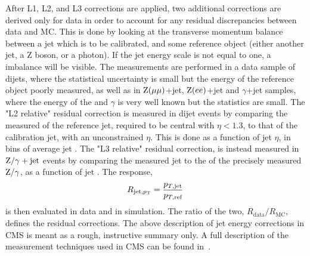 After L1, L2, and L3 corrections are applied, two additional corrections are derived only for data in order to account for any residual discrepancies between data and MC. This is done by looking at the transverse momentum balance between a jet which is to be calibrated, and some reference object (either another jet, a Z boson, or a photon). If the jet energy scale is not equal to one, a \PT imbalance will be visible. The measurements are performed in a data sample of dijets, where the statistical uncertainty is small but the energy of the reference object poorly measured, as well as in $\mathrm{Z}(\mu\mu)$+jet, $\mathrm{Z}(ee)$+jet and $\gamma$+jet samples, where the energy of the \PZ and $\gamma$ is very well known but the statistics are small. \newline
The  "L2 relative" residual correction is measured in dijet events by comparing the measured \PT of the reference jet, required to be central with $\eta<1.3$, to that of the calibration jet, with an unconstrained $\eta$. This is done as a function of jet $\eta$, in bins of average jet \PT. The "L3 relative" residual correction, is instead measured in $\mathrm{Z}/\gamma+\textrm{jet}$ events by comparing the measured jet \PT to the \PT of the precisely measured $\mathrm{Z}/\gamma$, as a function of jet \PT.
The response, 
\begin{equation*}
R_{\textrm{jet,\ensuremath{p_{\mathrm{T}}}}}=\frac{p_{T,\textrm{jet}}}{p_{T,\textrm{ref}}}
\end{equation*}
is then evaluated in data and in simulation. The ratio of the two, $R_{\textrm{data}}/R_{\textrm{MC}}$, defines the residual corrections.\newline\newline
The above description of jet energy corrections in CMS is meant as a rough, instructive summary only. A full description of the measurement techniques used in CMS can be found in~\cite{jme_jinst}. 

